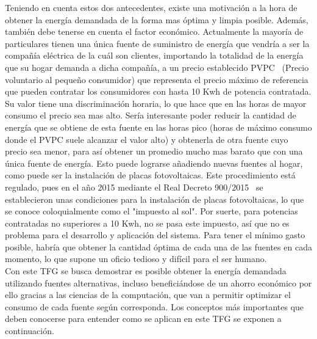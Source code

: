 Teniendo en cuenta estos dos antecedentes, existe una motivación a la hora de obtener la energía demandada de la forma mas óptima y limpia posible. Además, también debe tenerse en cuenta el factor económico. Actualmente la mayoría de particulares tienen una única fuente de suministro de energía que vendría a ser la compañía eléctrica de la cuál son clientes, importando la totalidad de la energía que su hogar demanda a dicha compañía, a un precio establecido \gls{PVPC}~\cite{Ree14} (Precio voluntario al pequeño consumidor) que representa el precio máximo de referencia que pueden contratar los consumidores con hasta 10 Kwh de potencia contratada. Su valor tiene una discriminación horaria, lo que hace que en las horas de mayor consumo el precio sea mas alto. Sería interesante poder reducir la cantidad de energía que se obtiene de esta fuente en las horas pico (horas de máximo consumo donde el \gls{PVPC} suele alcanzar el valor alto) y obtenerla de otra fuente cuyo precio sea menor, para así obtener un promedio mucho mas barato que con una única fuente de energía. Esto puede lograrse añadiendo nuevas fuentes al hogar, como puede ser la instalación de placas fotovoltaicas. Este procedimiento está regulado, pues en el año 2015 mediante el Real Decreto 900/2015~\cite{Boe15} se establecieron unas condiciones para la instalación de placas fotovoltaicas, lo que se conoce coloquialmente como el "impuesto al sol". Por suerte, para potencias contratadas no superiores a 10 Kwh, no se pasa este impuesto, así que no es problema para el desarrollo y aplicación del sistema. Para tener el mínimo gasto posible, habría que obtener la cantidad óptima de cada una de las fuentes en cada momento, lo que supone un oficio tedioso y difícil para el ser humano.\\

Con este \gls{TFG} se busca demostrar es posible obtener la energía demandada utilizando fuentes alternativas, incluso beneficiándose de un ahorro económico por ello gracias a las ciencias de la computación, que van a permitir optimizar el consumo de cada fuente según corresponda. Los conceptos más importantes que deben conocerse para entender como se aplican en este \gls{TFG} se exponen a continuación.

